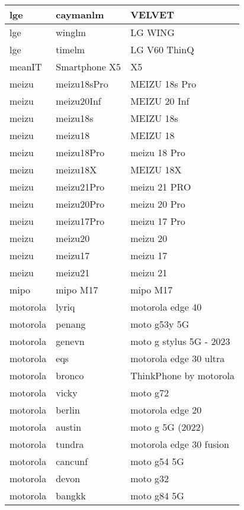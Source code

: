 \begin{tabularx}{\linewidth}{|l|X|X|}
        lge & caymanlm & VELVET \\ \hline
        lge & winglm & LG WING \\ \hline
        lge & timelm & LG V60 ThinQ \\ \hline
        meanIT & Smartphone X5 & X5 \\ \hline
        meizu & meizu18sPro & MEIZU 18s Pro \\ \hline
        meizu & meizu20Inf & MEIZU 20 Inf \\ \hline
        meizu & meizu18s & MEIZU 18s \\ \hline
        meizu & meizu18 & MEIZU 18 \\ \hline
        meizu & meizu18Pro & meizu 18 Pro \\ \hline
        meizu & meizu18X & MEIZU 18X \\ \hline
        meizu & meizu21Pro & meizu 21 PRO \\ \hline
        meizu & meizu20Pro & meizu 20 Pro \\ \hline
        meizu & meizu17Pro & meizu 17 Pro \\ \hline
        meizu & meizu20 & meizu 20 \\ \hline
        meizu & meizu17 & meizu 17 \\ \hline
        meizu & meizu21 & meizu 21 \\ \hline
        mipo & mipo M17 & mipo M17 \\ \hline
        motorola & lyriq & motorola edge 40 \\ \hline
        motorola & penang & moto g53y 5G \\ \hline
        motorola & genevn & moto g stylus 5G - 2023 \\ \hline
        motorola & eqs & motorola edge 30 ultra \\ \hline
        motorola & bronco & ThinkPhone by motorola \\ \hline
        motorola & vicky & moto g72 \\ \hline
        motorola & berlin & motorola edge 20 \\ \hline
        motorola & austin & moto g 5G (2022) \\ \hline
        motorola & tundra & motorola edge 30 fusion \\ \hline
        motorola & cancunf & moto g54 5G \\ \hline
        motorola & devon & moto g32 \\ \hline
        motorola & bangkk & moto g84 5G \\ \hline

\end{tabularx}
